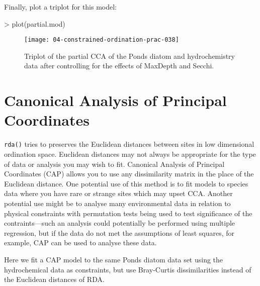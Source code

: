 \documentclass[a4paper,10pt]{article}
\newcommand{\rda}{\texttt{rda()}\xspace}
\begin{document}
Finally, plot a triplot for this model:

\begin{Schunk}
\begin{Sinput}
> plot(partial.mod)
\end{Sinput}
\end{Schunk}

\begin{figure}[t]
\begin{center}
\texttt{[image: 04-constrained-ordination-prac-038]}
\caption{\label{partial_triplot}Triplot of the partial CCA of the Ponds diatom and hydrochemistry data after controlling for the effects of MaxDepth and Secchi.}
\end{center}
\end{figure}

\section{Canonical Analysis of Principal Coordinates}
\rda tries to preserves the Euclidean distances between sites in low dimensional ordination space. Euclidean distances may not always be appropriate for the type of data or analysis you may wish to fit. Canonical Analysis of Principal Coordinates (CAP) allows you to use any dissimilarity matrix in the place of the Euclidean distance. One potential use of this method is to fit models to species data where you have rare or strange sites which may upset CCA. Another potential use might be to analyse many environmental data in relation to physical constraints with permutation tests being used to test significance of the contraints---such an analysis could potentially be performed using multiple regression, but if the data do not met the assumptions of least squares, for example, CAP can be used to analyse these data.

Here we fit a CAP model to the same Ponds diatom data set using the hydrochemical data as constraints, but use Bray-Curtis dissimilarities instead of the Euclidean distances of RDA.
\end{document}
